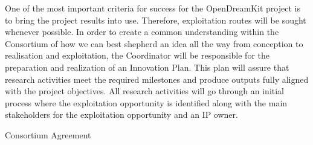 \begin{workpackage}
\begin{tasklist}
\begin{task}[title=Innovation management,wphases=6-48!.2,
id=project-innovation-management,lead=PS,PM=10,
partners={LL,UV,UJF,UB,UO,USH,USO,SA,UW,JU,UK,US,ZH,SR}] One of the
  most important criteria for success for the OpenDreamKit project is
  to bring the project results into use. Therefore, exploitation
  routes will be sought whenever possible. In order to create a common
  understanding within the Consortium of how we can best shepherd an
  idea all the way from conception to realisation and
  exploitation, the Coordinator will be responsible for the
  preparation and realization of an Innovation Plan. This plan will assure that
  research activities meet the required milestones and produce outputs 
  fully aligned with the project objectives.  All
  research activities will go through an initial process where the
  exploitation opportunity is identified along with the main
  stakeholders for the exploitation opportunity and an IP owner.
\end{task}
\end{tasklist}

%


\begin{wpdelivs}
\begin{wpdeliv}[due=1,id=ca,dissem=CO,nature=R,lead=PS]{Consortium Agreement}
\end{wpdeliv}


\end{wpdelivs}
\end{workpackage}
